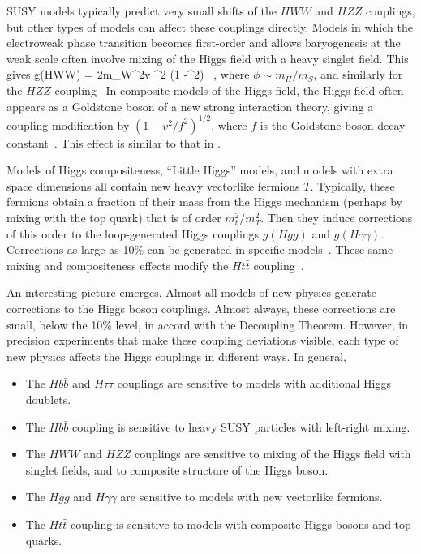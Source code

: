 SUSY models typically predict very small shifts of the $HWW$ and $HZZ$ couplings, but other types of models can affect these couplings directly.   Models in which the electroweak phase transition becomes first-order and allows baryogenesis at the weak scale often involve mixing of the Higgs field with a heavy singlet field.  This gives
\beq
           g(HWW) = {2m_W^2\over v} \cos^2\phi{} (1 -\half \phi^2) \ ,
where $\phi \sim  m_H/m_S$, and similarly for the $HZZ$ coupling~\cite{DiVita:2017eyz}   In composite models of the Higgs
 field, the Higgs field often appears as a Goldstone boson of a new strong interaction theory, giving a coupling modification by $(1- v^2/f^2)^{1/2}$, where $f$ is the Goldstone boson decay constant~\cite{Contino:2013kra}.  This effect is similar to that in .

Models of Higgs compositeness, ``Little Higgs'' models, and models with extra space dimensions all contain new heavy vectorlike fermions $T$.   Typically, these fermions obtain a fraction of their mass from the Higgs mechanism (perhaps by mixing with the top quark) that is of order $m_t^2/m_T^2$.   Then they induce corrections of this order to the loop-generated Higgs couplings $g(Hgg)$ and $g(H\gamma\gamma)$.  Corrections as large as 10\% can be generated in specific models~\cite{Han:2003gf}.   These same mixing and compositeness effects modify the $Ht\bar t$ coupling~\cite{Agashe:2004rs}.

An interesting picture emerges.   Almost all models of new physics generate corrections to the Higgs boson couplings.   Almost always, these corrections are small, below the 10\% level, in accord with the Decoupling Theorem.  However, in precision experiments that make these coupling deviations  visible, each type of new physics affects the Higgs couplings in different ways.  In general,
\begin{itemize}
\item The $Hb\bar b$ and $H\tau\tau$ couplings are sensitive to models with additional Higgs doublets.
\item The $Hb\bar b$ coupling is sensitive to heavy SUSY particles with left-right mixing.
\item The $HWW$ and $HZZ$ couplings are sensitive to mixing of the Higgs field with singlet fields, and to composite structure of the Higgs boson.
\item The $Hgg$ and $H\gamma\gamma$ are sensitive to models with new vectorlike fermions.
\item The $Ht\bar t$ coupling is sensitive to models with composite Higgs bosons and top quarks.
\end{itemize}

